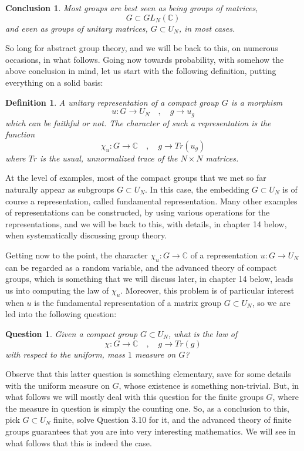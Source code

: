 \documentclass[12pt]{amsbook}
\newtheorem{conclusion}[theorem]{Conclusion}
\newtheorem{definition}[theorem]{Definition}
\newtheorem{question}[theorem]{Question}
\begin{document}
\begin{conclusion}
Most groups are best seen as being groups of matrices,
$$G\subset GL_N(\mathbb C)$$
and even as groups of unitary matrices, $G\subset U_N$, in most cases.
\end{conclusion}

So long for abstract group theory, and we will be back to this, on numerous occasions, in what follows. Going now towards probability, with somehow the above conclusion in mind, let us start with the following definition, putting everything on a solid basis:


\begin{definition}
A unitary representation of a compact group $G$ is a morphism
$$u:G\to U_N\quad,\quad g\to u_g$$
which can be faithful or not. The character of such a representation is the function
$$\chi_u:G\to\mathbb C\quad,\quad g\to Tr(u_g)$$
where $Tr$ is the usual, unnormalized trace of the $N\times N$ matrices.
\end{definition}

At the level of examples, most of the compact groups that we met so far naturally appear as subgroups $G\subset U_N$. In this case, the embedding $G\subset U_N$ is of course a representation, called fundamental representation. Many other examples of representations can be constructed, by using various operations for the representations, and we will be back to this, with details, in chapter 14 below, when systematically discussing group theory.

\bigskip

Getting now to the point, the character $\chi_u:G\to\mathbb C$ of a representation $u:G\to U_N$ can be regarded as a random variable, and the advanced theory of compact groups, which is something that we will discuss later, in chapter 14 below, leads us into computing the law of $\chi_u$. Moreover, this problem is of particular interest when $u$ is the fundamental representation of a matrix group $G\subset U_N$, so we are led into the following question:

\begin{question}
Given a compact group $G\subset U_N$, what is the law of
$$\chi:G\to\mathbb C\quad,\quad g\to Tr(g)$$
with respect to the uniform, mass $1$ measure on $G$?
\end{question}

Observe that this latter question is something elementary, save for some details with the uniform measure on $G$, whose existence is something non-trivial. But, in what follows we will mostly deal with this question for the finite groups $G$, where the measure in question is simply the counting one. So, as a conclusion to this, pick $G\subset U_N$ finite, solve Question 3.10 for it, and the advanced theory of finite groups guarantees that you are into very interesting mathematics. We will see in what follows that this is indeed the case.
\end{document}
